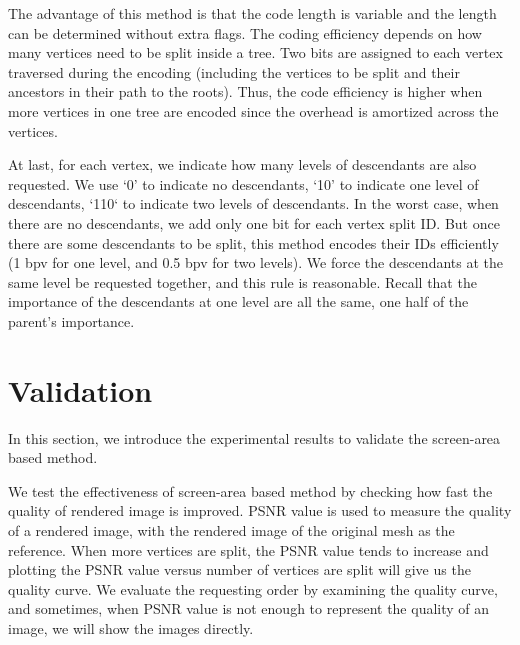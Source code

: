     The advantage of this method is that the code length is variable and the 
    length can be determined without extra flags. The coding efficiency depends
    on how many vertices need to be split inside a tree. Two bits
    are assigned to each vertex traversed during the encoding
    (including the vertices to be split and their ancestors in their path
    to the roots). Thus, the code efficiency is higher when more vertices in one tree
    are encoded since the overhead is amortized across the vertices. 

    At last, for each vertex, we indicate how many levels of descendants are also requested.
    We use `0' to indicate no descendants, `10' to indicate one level of descendants,
    `110` to indicate two levels of descendants. 
    In the worst case, when there are no descendants, we add only one bit for each vertex split
    ID. But once there are some descendants to be split, this method encodes their IDs 
    efficiently (1 bpv for one level, and 0.5 bpv for two levels). 
    We force the descendants at the same level be requested together, and 
    this rule is reasonable. Recall that the importance of the descendants at one level are all the same, 
    one half of the parent's importance.
\section{Validation}
In this section, we introduce the experimental results to 
validate the screen-area based method.
\label{s:dstream:evaluation}

We test the effectiveness of screen-area based method by checking
how fast the quality of rendered image is improved. PSNR value 
is used to measure the quality of a rendered
image, with the rendered image of the original mesh as the reference. 
When more vertices are split, the PSNR value tends to increase
and plotting the PSNR value versus number of vertices are split
will give us the quality curve. 
We evaluate the requesting order by examining the quality
curve, and sometimes, when PSNR value is not enough to 
represent the quality of an image, we will show the images directly.

